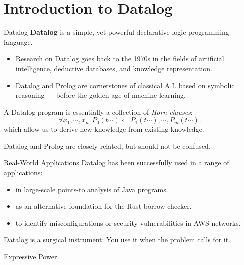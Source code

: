 \section{Introduction to Datalog}

\begin{frame}{Datalog}
\textbf{Datalog} is a simple, yet powerful declarative logic programming language.
\begin{itemize}
    \pause \item Research on Datalog goes back to the 1970s in the fields of artificial
    intelligence, deductive databases, and knowledge representation.
    \pause \item Datalog and Prolog are cornerstones of classical A.I. based on
    symbolic reasoning --- before the golden age of machine learning.
\end{itemize}

\pause

A Datalog program is essentially a collection of \emph{Horn clauses}:
%
$$
\forall x_1, \cdots, x_n. \, P_0(t \cdots) \Leftarrow P_1(t \cdots), \cdots, P_m(t \cdots).
$$
which allow us to derive new knowledge from existing knowledge.

\pause

Datalog and Prolog are closely related, but should not be confused.
\end{frame}

\begin{frame}{Real-World Applications}
Datalog has been successfully used in a range of applications:

\begin{itemize}
    \item in large-scale points-to analysis of Java programs.
    \item as an alternative foundation for the Rust borrow checker.
    \item to identify misconfigurations or security vulnerabilities in AWS networks.
\end{itemize}

\pause

Datalog is a surgical instrument: You use it when the problem calls for it. 
\end{frame}

\begin{frame}{Expressive Power}
\centering
\medskip
\medskip
{}
\end{frame}


